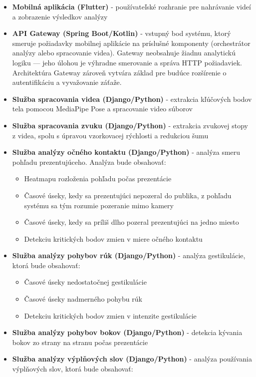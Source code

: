 \begin{itemize}
    \item \textbf{Mobilná aplikácia (Flutter)} - používateľské rozhranie pre nahrávanie videí a zobrazenie výsledkov analýzy
    \item \textbf{API Gateway (Spring Boot/Kotlin)} - vstupný bod systému, ktorý smeruje požiadavky mobilnej aplikácie na príslušné komponenty (orchestrátor analýzy alebo spracovanie videa). Gateway neobsahuje žiadnu analytickú logiku --- jeho úlohou je výhradne smerovanie a správa HTTP požiadaviek. Architektúra Gateway zároveň vytvára základ pre budúce rozšírenie o autentifikáciu a vyvažovanie záťaže.
    \item \textbf{Služba spracovania videa (Django/Python)} - extrakcia kľúčových bodov tela pomocou MediaPipe Pose a spracovanie video súborov
    \item \textbf{Služba spracovania zvuku (Django/Python)} - extrakcia zvukovej stopy z videa, spolu s úpravou vzorkovacej rýchlosti a redukciou šumu
    \item \textbf{Služba analýzy očného kontaktu (Django/Python)} - analýza smeru pohľadu prezentujúceho. Analýza bude obsahovať:
    \begin{itemize}
        \item Heatmapu rozloženia pohľadu počas prezentácie
        \item Časové úseky, kedy sa prezentujúci nepozeral do publika, z pohľadu systému sa tým rozumie pozeranie mimo kamery
        \item Časové úseky, kedy sa príliš dlho pozeral prezentujúci na jedno miesto
        \item Detekciu kritických bodov zmien v miere očného kontaktu
    \end{itemize}
    \item \textbf{Služba analýzy pohybov rúk (Django/Python)} - analýza gestikulácie, ktorá bude obsahovať:
    \begin{itemize}
        \item Časové úseky nedostatočnej gestikulácie
        \item Časové úseky nadmerného pohybu rúk
        \item Detekciu kritických bodov zmien v intenzite gestikulácie
    \end{itemize}
    \item \textbf{Služba analýzy pohybov bokov (Django/Python)} - detekcia kývania bokov zo strany na stranu počas prezentácie
    \item \textbf{Služba analýzy výplňových slov (Django/Python)} - analýza používania výplňových slov, ktorá bude obsahovať:

\end{itemize}
